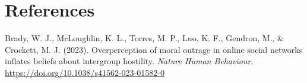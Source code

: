 \documentclass[
  man]{apa6}
\newlength{\cslhangindent}
\newlength{\cslentryspacingunit} %
\newenvironment{CSLReferences}[2] %
 {%
  \setlength{\parindent}{0pt}
  \ifodd #1
  \let\oldpar\par
  \def\par{\hangindent=\cslhangindent\oldpar}
  \fi
  \setlength{\parskip}{#2\cslentryspacingunit}
 }%
 {}
\begin{document}
\newpage

\hypertarget{references}{%
\section{References}\label{references}}

Brady, W. J., McLoughlin, K. L., Torres, M. P., Luo, K. F., Gendron, M., \& Crockett, M. J. (2023). Overperception of moral outrage in online social networks inflates beliefs about intergroup hostility. \emph{Nature Human Behaviour}. \url{https://doi.org/10.1038/s41562-023-01582-0}

\hypertarget{refs}{}
\begin{CSLReferences}{0}{0}
\end{CSLReferences}
\end{document}
